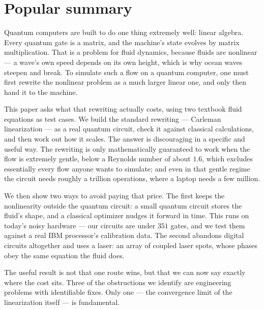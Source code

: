 \documentclass[aps,prx,twocolumn,notitlepage,superscriptaddress,floatfix,10pt]{revtex4-2}
\begin{document}
\maketitle

\section*{Popular summary}
\noindent
Quantum computers are built to do one thing extremely well: linear algebra. Every quantum gate is a
matrix, and the machine's state evolves by matrix multiplication. That is a problem for fluid
dynamics, because fluids are nonlinear --- a wave's own speed depends on its own height, which is why
ocean waves steepen and break. To simulate such a flow on a quantum computer, one must first rewrite
the nonlinear problem as a much larger linear one, and only then hand it to the machine.

This paper asks what that rewriting actually costs, using two textbook fluid equations as test cases.
We build the standard rewriting --- Carleman linearization --- as a real quantum circuit, check it
against classical calculations, and then work out how it scales. The answer is discouraging in a
specific and useful way. The rewriting is only mathematically guaranteed to work when the flow is
extremely gentle, below a Reynolds number of about $1.6$, which excludes essentially every flow anyone
wants to simulate; and even in that gentle regime the circuit needs roughly a trillion operations,
where a laptop needs a few million.

We then show two ways to avoid paying that price. The first keeps the nonlinearity outside the
quantum circuit: a small quantum circuit stores the fluid's shape, and a classical optimizer nudges it
forward in time. This runs on today's noisy hardware --- our circuits are under $351$ gates, and we
test them against a real IBM processor's calibration data. The second abandons digital circuits
altogether and uses a laser: an array of coupled laser spots, whose phases obey the same equation the
fluid does.

The useful result is not that one route wins, but that we can now say exactly where the cost sits.
Three of the obstructions we identify are engineering problems with identifiable fixes. Only one --- the
convergence limit of the linearization itself --- is fundamental.
\end{document}
